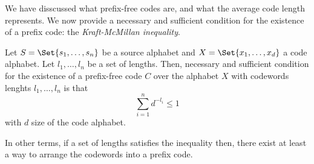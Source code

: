 \documentclass{subfiles}
\begin{document}
    We have disscussed what prefix-free codes are, 
        and what the average code length represents.
    We now provide a necessary and sufficient condition for the existence of 
    a prefix code: the \emph{Kraft-McMillan inequality}.
    \begin{theorem}\label{Thm:2}
        Let \(S = \Set{s_{1}, \ldots, s_{n}}\) be a source alphabet
        and \(X =\Set{x_{1}, \ldots, x_{d}}\) a code alphabet.
        Let \(l_{1}, \ldots, l_{n}\) be a set of lengths.
        Then, necessary and sufficient condition for the existence of a 
        prefix-free code \(C\) over the alphabet \(X\) with codewords lenghts 
        \(l_{1}, \ldots, l_{n}\) is that 
        \[
            \sum_{i = 1}^{n}{d^{-l_{i}}} \le 1
        \]
        with \(d\) size of the code alphabet.
    \end{theorem}
    In other terms, if a set of lengths satisfies the inequality then,
        there exist at least a way to arrange the codewords into a prefix code.
\end{document}
